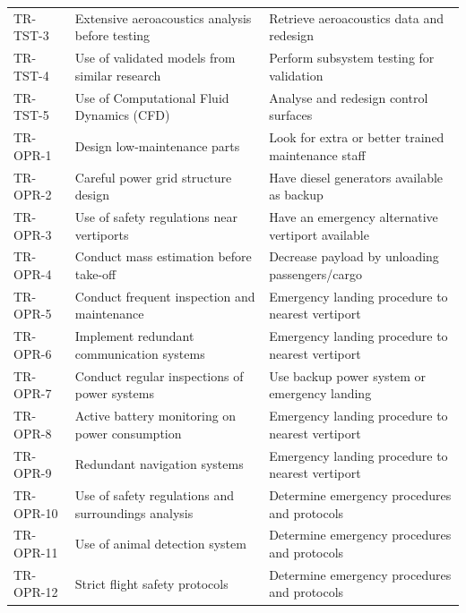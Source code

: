 \begin{table}[H]
{\begin{tabular}{l|l|l}
TR-TST-3         & Extensive aeroacoustics analysis before testing          & Retrieve aeroacoustics data and redesign                    \\
TR-TST-4         & Use of validated models from similar research            & Perform subsystem testing  for validation                   \\
TR-TST-5         & Use of Computational Fluid Dynamics (CFD)                & Analyse and redesign control surfaces                       \\
TR-OPR-1         & Design low-maintenance parts                             & Look for extra or better trained maintenance staff          \\
TR-OPR-2         & Careful power grid structure design                      & Have diesel generators available as backup                  \\
TR-OPR-3         & Use of safety regulations near vertiports                & Have an emergency alternative vertiport available           \\
TR-OPR-4         & Conduct mass estimation before take-off                  & Decrease payload by unloading passengers/cargo              \\
TR-OPR-5         & Conduct frequent inspection and maintenance              & Emergency landing  procedure to nearest vertiport           \\
TR-OPR-6         & Implement redundant communication systems                & Emergency landing  procedure to nearest vertiport           \\
TR-OPR-7         & Conduct regular inspections of power systems             & Use backup power system or emergency landing                \\
TR-OPR-8         & Active  battery monitoring on power consumption          & Emergency landing  procedure to nearest vertiport           \\
TR-OPR-9         & Redundant navigation systems                             & Emergency landing  procedure to nearest vertiport           \\
TR-OPR-10        & Use of safety regulations and surroundings analysis      & Determine emergency procedures and protocols                \\
TR-OPR-11        & Use of animal detection system                           & Determine emergency procedures and protocols                \\
TR-OPR-12        & Strict flight safety protocols                           & Determine emergency procedures and protocols                \\

\end{tabular}}
\end{table}
